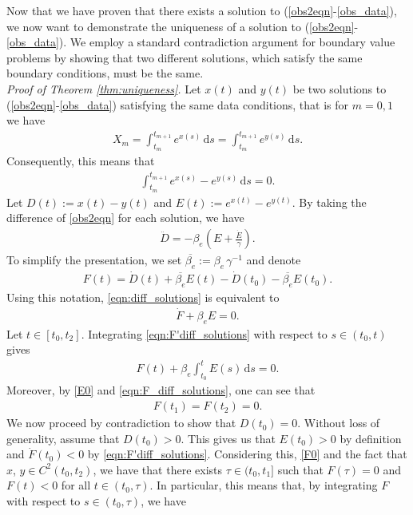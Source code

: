 \documentclass{article}
\newcommand{\ds}{\text{d}s}
\newcommand{\obs}{(\ref{obs2eqn}-\ref{obs_data})}
\newcommand{\obss}{(\ref{obs2eqn}-\ref{obs_data}) }
\newcommand{\be}{\beta_e}
\newcommand{\bb}{\overline{\be}}
\begin{document}
Now that we have proven that there exists a solution to \obs, we now want to demonstrate the uniqueness of a solution to \obs. We employ a standard contradiction argument for boundary value problems by showing that two different solutions, which satisfy the same boundary conditions, must be the same. \\

\noindent \textit{Proof of Theorem \ref{thm:uniqueness}.} Let $x(t)$ and $y(t)$ be two solutions to \obss satisfying the same data conditions, that is for $m = 0, 1$ we have
%
\begin{align*}
    X_m = \int_{t_m}^{t_{m+1}} e^{x(s)} \, \ds = \int_{t_m}^{t_{m+1}} e^{y(s)} \, \ds. %
\end{align*}
%
Consequently, this means that 
%
\begin{align}
    \int_{t_m}^{t_{m+1}} e^{x(s)} - e^{y(s)} \, \ds = 0. \label{E0}
\end{align}
%
Let $D(t) := x(t) - y(t)$ and $E(t) := e^{x(t)} - e^{y(t)}$. By taking the difference of \eqref{obs2eqn} for each solution, we have
%
\begin{align}
    \ddot{D} = -\be \left(E + \frac{\dot{E}}{\gamma} \right). \label{eqn:diff_solutions}
\end{align}
%
To simplify the presentation, we set $\bb := \be \, \gamma^{-1}$ and denote 
%
\begin{align*}
    F(t) = \dot{D}(t) + \bb E(t) - \dot{D}(t_0) - \bb E(t_0). %
\end{align*}
%
Using this notation, \eqref{eqn:diff_solutions} is equivalent to
%
\begin{align}
    \label{eqn:F'diff_solutions}
    \dot{F} + \be E = 0.
\end{align}
%
Let $t \in [t_0,t_2]$. Integrating \eqref{eqn:F'diff_solutions} with respect to $s \in (t_0,t)$ gives
%
\begin{align}
    \label{eqn:F_diff_solutions}
    F(t) + \be \int_{t_0}^t E(s) \, \ds = 0.
\end{align}
%
Moreover, by \eqref{E0} and \eqref{eqn:F_diff_solutions}, one can see that 
%
\begin{align}
    F(t_1) = F(t_2) = 0. \label{F0}
\end{align}
%
We now proceed by contradiction to show that $D(t_0) = 0$. Without loss of generality, assume that $D(t_0) > 0$. This gives us that $E(t_0) > 0$ by definition and $\dot{F}(t_0) < 0$ by \eqref{eqn:F'diff_solutions}. Considering this, \eqref{F0} and the fact that $x$, $y \in C^2(t_0,t_2)$, we have that there exists $\tau \in (t_0,t_1]$ such that $F(\tau) = 0$ and $F(t) < 0 $ for all $t \in (t_0,\tau)$. In particular, this means that, by integrating $F$ with respect to $s \in (t_0,\tau)$, we have
\end{document}
